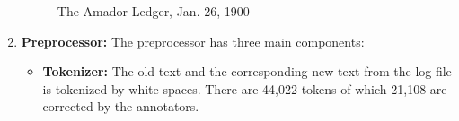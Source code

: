 \documentclass{sig-alternate}
\begin{document}
\begin{enumerate}

\begin{figure*}
\centering
{}
\label{fig:T1}
\label{fig:T2}
\caption{The Amador Ledger, Jan. 26, 1900}
\end{figure*}





\item \textbf{Preprocessor: } The preprocessor has three main components:
\begin{itemize}
\item \textbf{Tokenizer: } The old text and the corresponding new text from the log file is tokenized by white-spaces. There are 44,022 tokens of which 21,108 are corrected by the annotators.


\end{itemize}
\end{enumerate}
\end{document}
